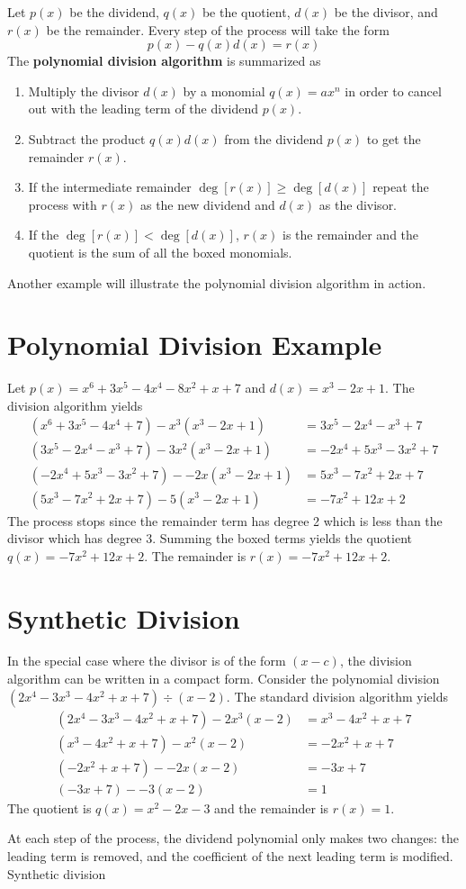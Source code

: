 \documentclass[12pt]{article}
\numberwithin{equation}{section}
\begin{document}
Let $p(x)$ be the dividend, $q(x)$ be the quotient, $d(x)$ be the divisor, and $r(x)$ be the remainder. Every step of the process will take the form
\begin{equation}
p(x) - q(x)d(x) = r(x)
\end{equation}
The \textbf{polynomial division algorithm} is summarized as 
\begin{enumerate}
\item Multiply the divisor $d(x)$ by a monomial $q(x) = ax^n$ in order to cancel out with the leading term of the dividend $p(x)$.
\item Subtract the product $q(x)d(x)$ from the dividend $p(x)$ to get the remainder $r(x)$.
\item If the intermediate remainder $\deg[r(x)] \geq \deg[d(x)]$ repeat the process with $r(x)$ as the new dividend and $d(x)$ as the divisor.
\item If the $\deg[r(x)] < \deg[d(x)]$, $r(x)$ is the remainder and the quotient is the sum of all the boxed monomials.
\end{enumerate}
Another example will illustrate the polynomial division algorithm in action.

\section{Polynomial Division Example}
Let $p(x) = x^6+3x^5-4x^4-8x^2+x+7$ and $d(x) = x^3-2x+1$. The division algorithm yields
\begin{align*}
(x^6+3x^5-4x^4+7) - \boxed{x^3} (x^3-2x+1) &= 3x^5-2x^4-x^3+7 \\
(3x^5-2x^4-x^3+7) - \boxed{3x^2} (x^3-2x+1) &= -2x^4+5x^3-3x^2+7 \\
(-2x^4+5x^3-3x^2+7) - \boxed{-2x} (x^3-2x+1) &= 5x^3-7x^2+2x+7 \\
(5x^3-7x^2+2x+7) - \boxed{5} (x^3-2x+1) &= -7x^2+12x+2
\end{align*}
The process stops since the remainder term has degree 2 which is less than the divisor which has degree 3. Summing the boxed terms yields the quotient $q(x) = -7x^2+12x+2$. The remainder is $r(x) = -7x^2+12x+2$. 

\section{Synthetic Division}
In the special case where the divisor is of the form $(x-c)$, the division algorithm can be written in a compact form. Consider the polynomial division $(2x^4-3x^3-4x^2+x+7) \div (x-2)$. The standard division algorithm yields
\begin{align*}
(2x^4-3x^3-4x^2+x+7) - \boxed{2x^3}(x-2) &= x^3-4x^2+x+7 \\
(x^3-4x^2+x+7) - \boxed{x^2}(x-2) &= -2x^2+x+7 \\
(-2x^2+x+7) - \boxed{-2x}(x-2) &= -3x+7 \\
(-3x+7) - \boxed{-3}(x-2) &= 1
\end{align*}
The quotient is $q(x) = x^2-2x-3$ and the remainder is $r(x) = 1$.

At each step of the process, the dividend polynomial only makes two changes: the leading term is removed, and the coefficient of the next leading term is modified. Synthetic division 
\end{document}
